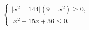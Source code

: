 \begin{ex}[type=ineq_system]
	\begin{condition}
	$\begin{cases} \big|x^2 - 144\big|(9 - x^2)\geqslant0 ,\\
			\; x^2 + 15x + 36\leqslant 0  .
		\end{cases}$
	\end{condition}
\end{ex}